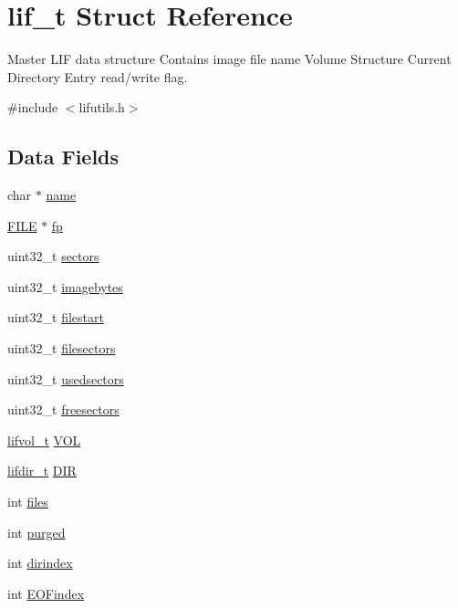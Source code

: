 \hypertarget{structlif__t}{}\section{lif\+\_\+t Struct Reference}
\label{structlif__t}


Master L\+IF data structure Contains image file name Volume Structure Current Directory Entry read/write flag.  




{\ttfamily \#include $<$lifutils.\+h$>$}

\subsection*{Data Fields}
\begin{DoxyCompactItemize}
\item 
char $\ast$ \hyperlink{structlif__t_ae6b943f3c26005fc375169960e9049f7}{name}
\item 
\hyperlink{posix_8h_aed4dabeb9f7c518ded42f930a04abce8}{F\+I\+LE} $\ast$ \hyperlink{structlif__t_ad679ba16ca21371a649981a4cca9e64c}{fp}
\item 
uint32\+\_\+t \hyperlink{structlif__t_a262b14d8547abff49d9dd1b445faf6d5}{sectors}
\item 
uint32\+\_\+t \hyperlink{structlif__t_afabd64e66adb03eef2249b6c627faac7}{imagebytes}
\item 
uint32\+\_\+t \hyperlink{structlif__t_a3c1bcc66b694d07ebc304ef7cb66b4ef}{filestart}
\item 
uint32\+\_\+t \hyperlink{structlif__t_a1223702cce63f879654d51773243643d}{filesectors}
\item 
uint32\+\_\+t \hyperlink{structlif__t_ad81767a2f65b997d5abecba130b89814}{usedsectors}
\item 
uint32\+\_\+t \hyperlink{structlif__t_a1fc11461eb5643d84e229772f7623152}{freesectors}
\item 
\hyperlink{structlifvol__t}{lifvol\+\_\+t} \hyperlink{structlif__t_ae68126d2b9261ef9a6903a95d5c82cac}{V\+OL}
\item 
\hyperlink{structlifdir__t}{lifdir\+\_\+t} \hyperlink{structlif__t_aefeaa526c04a2b8715b0392feeec52a3}{D\+IR}
\item 
int \hyperlink{structlif__t_aceca398e2e3f6bcffe1593969544d546}{files}
\item 
int \hyperlink{structlif__t_a1dfef3ca99d6ba9680bb9b6bf8fafc32}{purged}
\item 
int \hyperlink{structlif__t_a74f8af3dc203c3c6b9dea3829bb4b6fa}{dirindex}
\item 
int \hyperlink{structlif__t_a68c465a879c7d4bd2279682185b6250e}{E\+O\+Findex}
\end{DoxyCompactItemize}


